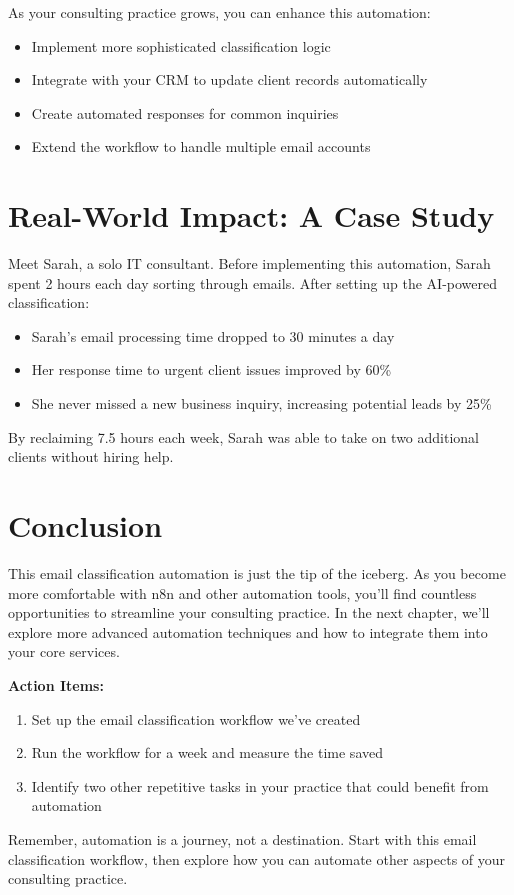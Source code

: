As your consulting practice grows, you can enhance this automation:

\begin{itemize}
    \item Implement more sophisticated classification logic
    \item Integrate with your CRM to update client records automatically
    \item Create automated responses for common inquiries
    \item Extend the workflow to handle multiple email accounts
\end{itemize}


\section{Real-World Impact: A Case Study}

Meet Sarah, a solo IT consultant. Before implementing this automation, Sarah spent 2 hours each day sorting through emails. After setting up the AI-powered classification:

\begin{itemize}
    \item Sarah's email processing time dropped to 30 minutes a day
    \item Her response time to urgent client issues improved by 60\%
    \item She never missed a new business inquiry, increasing potential leads by 25\%
\end{itemize}

By reclaiming 7.5 hours each week, Sarah was able to take on two additional clients without hiring help.


\section{Conclusion}

This email classification automation is just the tip of the iceberg. As you become more comfortable with n8n and other automation tools, you'll find countless opportunities to streamline your consulting practice. In the next chapter, we'll explore more advanced automation techniques and how to integrate them into your core services.

\textbf{Action Items:}
\begin{enumerate}
    \item Set up the email classification workflow we've created
    \item Run the workflow for a week and measure the time saved
    \item Identify two other repetitive tasks in your practice that could benefit from automation
\end{enumerate}

Remember, automation is a journey, not a destination. Start with this email classification workflow, then explore how you can automate other aspects of your consulting practice.

